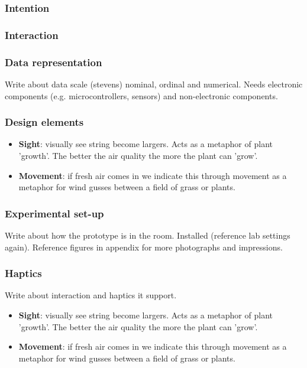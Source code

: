\subsubsection{Intention}

\subsubsection{Interaction}

\subsubsection{Data representation}

Write about data scale (stevens) nominal, ordinal and numerical. Needs electronic components (e.g. microcontrollers, sensors) and non-electronic components.

\subsubsection{Design elements}

\begin{itemize}
  \item \textbf{Sight}: visually see string become largers. Acts as a metaphor of plant 'growth'. The better the air quality the more the plant can 'grow'.
  \item \textbf{Movement}: if fresh air comes in we indicate this through movement as a metaphor for wind gusses between a field of grass or plants.
\end{itemize}

\subsubsection{Experimental set-up}

Write about how the prototype is in the room. Installed (reference lab settings again). Reference figures in appendix for more photographs and impressions.

\subsubsection{Haptics}

Write about interaction and haptics it support.

\begin{itemize}
  \item \textbf{Sight}: visually see string become largers. Acts as a metaphor of plant 'growth'. The better the air quality the more the plant can 'grow'.
  \item \textbf{Movement}: if fresh air comes in we indicate this through movement as a metaphor for wind gusses between a field of grass or plants.
\end{itemize}

